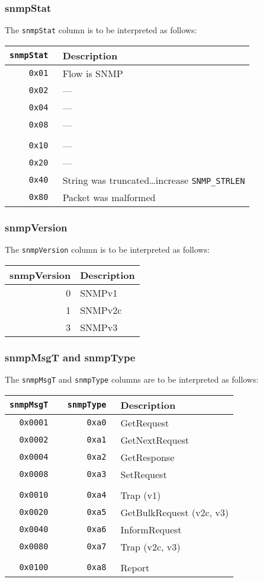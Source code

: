 \documentclass[documentation]{subfiles}
\begin{document}
\subsubsection{snmpStat}\label{snmpStat}
The {\tt snmpStat} column is to be interpreted as follows:
\begin{longtable}{>{\tt}rl}
    \toprule
    {\bf snmpStat} & {\bf Description}\\
    \midrule\endhead%
    0x01 & Flow is SNMP\\
    0x02 & ---\\
    0x04 & ---\\
    0x08 & ---\\
    \\
    0x10 & ---\\
    0x20 & ---\\
    0x40 & String was truncated\ldots increase {\tt SNMP\_STRLEN}\\
    0x80 & Packet was malformed\\
    \bottomrule
\end{longtable}

\subsubsection{snmpVersion}\label{snmpVersion}
The {\tt snmpVersion} column is to be interpreted as follows:
\begin{longtable}{rl}
    \toprule
    {\bf snmpVersion} & {\bf Description}\\
    \midrule\endhead%
    0 & SNMPv1\\
    1 & SNMPv2c\\
    3 & SNMPv3\\
    \bottomrule
\end{longtable}

\subsubsection{snmpMsgT and snmpType}\label{snmpTypes}
The {\tt snmpMsgT} and {\tt snmpType} columns are to be interpreted as follows:
\begin{longtable}{>{\tt}r>{\tt}rl}
    \toprule
    {\bf snmpMsgT} & {\bf snmpType} & {\bf Description}\\
    \midrule\endhead%
    0x0001 & 0xa0 & GetRequest\\
    0x0002 & 0xa1 & GetNextRequest\\
    0x0004 & 0xa2 & GetResponse\\
    0x0008 & 0xa3 & SetRequest\\
    \\
    0x0010 & 0xa4 & Trap (v1)\\
    0x0020 & 0xa5 & GetBulkRequest (v2c, v3)\\
    0x0040 & 0xa6 & InformRequest\\
    0x0080 & 0xa7 & Trap (v2c, v3)\\
    \\
    0x0100 & 0xa8 & Report\\
    \bottomrule
\end{longtable}
\end{document}
